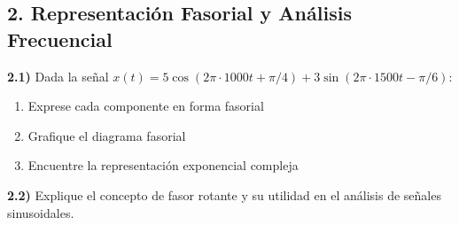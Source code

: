 \subsection*{2. Representación Fasorial y Análisis Frecuencial}

\textbf{2.1)} Dada la señal \( x(t) = 5\cos(2\pi \cdot 1000t + \pi/4) + 3\sin(2\pi \cdot 1500t - \pi/6) \):
\begin{enumerate}[label=\alph*)]
    \item Exprese cada componente en forma fasorial
    \item Grafique el diagrama fasorial
    \item Encuentre la representación exponencial compleja
\end{enumerate}

\textbf{2.2)} Explique el concepto de fasor rotante y su utilidad en el análisis de señales sinusoidales.
